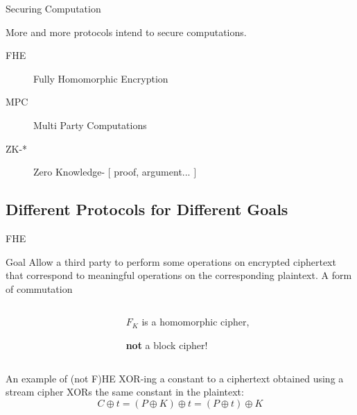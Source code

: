 \documentclass[presentation,aspectratio=1610]{beamer}
\begin{document}
\begin{frame}{Securing Computation}
  \begin{center}
    {\Large More and more protocols intend to secure \alert{computations}.}

    \vspace{0.8cm}
    
    \begin{description}
    \item[FHE] \alert{F}ully \alert{H}omomorphic \alert{E}ncryption
    \item[MPC] \alert{M}ulti \alert{P}arty \alert{C}omputations
    \item[ZK-*] \alert{Z}ero \alert{K}nowledge- $[$ proof, argument... $]$
    \end{description}
  \end{center}
\end{frame}


\subsection{Different Protocols for Different Goals}

\begin{frame}{FHE}
  \begin{exampleblock}{Goal}
    Allow a third party to perform some operations on encrypted ciphertext that correspond to meaningful operations on the corresponding plaintext. \hfill \pause \alert{A form of commutation}    
  \end{exampleblock}

  \pause

  \begin{columns}
    \begin{column}{0.55\textwidth}
      \begin{center}
      \end{center}
    \end{column}
    \begin{column}{0.4\textwidth}
      $F_K$ is a homomorphic cipher,

      \textbf{not} a block cipher!
    \end{column}
  \end{columns}

  \pause

  \begin{alertblock}{An example of (not F)HE}
    XOR-ing a constant to a ciphertext obtained using a stream cipher XORs the same constant in the plaintext:
    \begin{equation*}
      C \oplus t  = (P \oplus K) \oplus t = (P \oplus t) \oplus K
    \end{equation*}
  \end{alertblock}
\end{frame}
\end{document}
